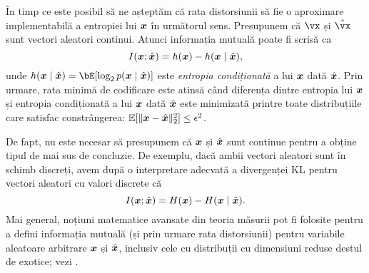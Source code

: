 \documentclass[../../book-main_ro.tex]{subfiles}
\begin{document}
\begin{remark}
	În timp ce este posibil să ne așteptăm că rata distorsiunii să fie o aproximare implementabilă a entropiei lui $\bm{x}$ în următorul sens. Presupunem că $\vx$ și $\hat{\vx}$ sunt vectori aleatori continui. Atunci informația mutuală poate fi scrisă ca
	\begin{equation}\label{eq:information-entropy}
		I(\bm{x}; \hat{\bm{x}}) = h(\bm{x}) - h(\bm{x} \mid \hat {\bm{x}}),
	\end{equation}
	unde $h(\x \mid \hat \x) = \bE[\log_2 p(\x \mid \hat\x)]$ este \textit{entropia condiționată} a lui $\bm{x}$ dată $\hat {\bm{x}}$.
	Prin urmare, rata minimă de codificare este atinsă când diferența dintre entropia lui $\bm{x}$ și entropia condiționată a lui $\bm{x}$ dată $\hat {\bm{x}}$ este minimizată printre toate distribuțiile care satisfac constrângerea: $\mathbb{E} [\norm{\x- \hat \x}_2^2] \le \epsilon^2$.

	De fapt, nu este necesar să presupunem că $\bm{x}$ și $\hat {\bm{x}}$ sunt continue pentru a obține tipul de mai sus de concluzie. De exemplu, dacă ambii vectori aleatori sunt în schimb discreți, avem după o interpretare adecvată a divergenței KL pentru vectori aleatori cu valori discrete că
	\begin{equation}
		I(\bm{x}; \hat{\bm{x}}) = H(\bm{x}) - H(\bm{x} \mid \hat {\bm{x}}).
	\end{equation}
	Mai general, noțiuni matematice avansate din teoria măsurii pot fi folosite pentru a defini informația mutuală (și prin urmare rata distorsiunii) pentru variabile aleatoare arbitrare $\bm{x}$ și $\hat {\bm{x}}$, inclusiv cele cu distribuții cu dimensiuni reduse destul de exotice; vezi \textcite[\S 8.5]{Cover-Thomas}.
\end{remark}
\end{document}
